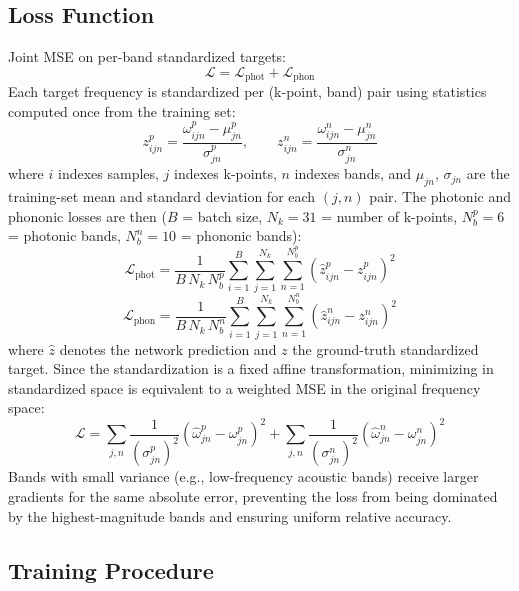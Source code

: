 \documentclass[11pt]{article}
\begin{document}
\subsection{Loss Function}
\label{sec:loss}

Joint MSE on per-band standardized targets:
\begin{equation}
    \mathcal{L} = \mathcal{L}_{\text{phot}} + \mathcal{L}_{\text{phon}}
    \label{eq:loss}
\end{equation}
Each target frequency is standardized per (k-point, band) pair using statistics computed once from the training set:
\begin{equation}
    z^p_{ijn} = \frac{\omega^p_{ijn} - \mu^p_{jn}}{\sigma^p_{jn}}, \qquad
    z^n_{ijn} = \frac{\omega^n_{ijn} - \mu^n_{jn}}{\sigma^n_{jn}}
\end{equation}
where $i$ indexes samples, $j$ indexes k-points, $n$ indexes bands, and $\mu_{jn}$, $\sigma_{jn}$ are the training-set mean and standard deviation for each $(j,n)$ pair. The photonic and phononic losses are then ($B$ = batch size, $N_k = 31$ = number of k-points, $N_b^p = 6$ = photonic bands, $N_b^n = 10$ = phononic bands):
\begin{equation}
    \mathcal{L}_{\text{phot}} = \frac{1}{B\, N_k\, N_b^p} \sum_{i=1}^{B}\sum_{j=1}^{N_k}\sum_{n=1}^{N_b^p} \left(\hat{z}^p_{ijn} - z^p_{ijn}\right)^2
    \label{eq:loss_phot}
\end{equation}
\begin{equation}
    \mathcal{L}_{\text{phon}} = \frac{1}{B\, N_k\, N_b^n} \sum_{i=1}^{B}\sum_{j=1}^{N_k}\sum_{n=1}^{N_b^n} \left(\hat{z}^n_{ijn} - z^n_{ijn}\right)^2
    \label{eq:loss_phon}
\end{equation}
where $\hat{z}$ denotes the network prediction and $z$ the ground-truth standardized target. Since the standardization is a fixed affine transformation, minimizing in standardized space is equivalent to a weighted MSE in the original frequency space:
\begin{equation}
    \mathcal{L} = \sum_{j,n} \frac{1}{(\sigma^p_{jn})^2}\left(\hat{\omega}^p_{jn} - \omega^p_{jn}\right)^2
    + \sum_{j,n} \frac{1}{(\sigma^n_{jn})^2}\left(\hat{\omega}^n_{jn} - \omega^n_{jn}\right)^2
\end{equation}
Bands with small variance (e.g., low-frequency acoustic bands) receive larger gradients for the same absolute error, preventing the loss from being dominated by the highest-magnitude bands and ensuring uniform relative accuracy.

\subsection{Training Procedure}
\end{document}
